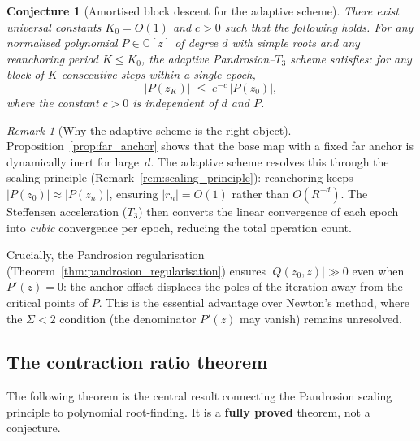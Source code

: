 \documentclass[10pt,a4paper,oneside]{book}
\newtheorem{conjecture}[theorem]{Conjecture}
\theoremstyle{definition}
\theoremstyle{remark}
\newtheorem{remark}[theorem]{Remark}
\newcommand{\CC}{\mathbb{C}}
\begin{document}
\begin{conjecture}[Amortised block descent for the adaptive scheme]
\label{conj:block_descent}
There exist universal constants $K_0 = O(1)$ and $c > 0$ such that the following holds.  For any normalised polynomial $P \in \CC[z]$ of degree $d$ with simple roots and any reanchoring period $K \leq K_0$, the adaptive Pandrosion--$T_3$ scheme satisfies: for any block of $K$ consecutive steps within a single epoch,
\begin{equation}
  \label{eq:block_descent}
  |P(z_{K})| \;\leq\; e^{-c}\, |P(z_0)|,
\end{equation}
where the constant $c > 0$ is independent of $d$ and $P$.
\end{conjecture}

\begin{remark}[Why the adaptive scheme is the right object]
\label{rem:why_adaptive}
Proposition~\ref{prop:far_anchor} shows that the base map with a fixed far anchor is dynamically inert for large~$d$.  The adaptive scheme resolves this through the scaling principle (Remark~\ref{rem:scaling_principle}): reanchoring keeps $|P(z_0)| \approx |P(z_n)|$, ensuring $|r_n| = O(1)$ rather than $O(R^{-d})$.  The Steffensen acceleration ($T_3$) then converts the linear convergence of each epoch into \emph{cubic} convergence per epoch, reducing the total operation count.

Crucially, the Pandrosion regularisation (Theorem~\ref{thm:pandrosion_regularisation}) ensures $|Q(z_0,z)| \gg 0$ even when $P'(z) = 0$: the anchor offset displaces the poles of the iteration away from the critical points of $P$.  This is the essential advantage over Newton's method, where the $\bar{\Sigma} < 2$ condition (the denominator $P'(z)$ may vanish) remains unresolved.
\end{remark}

\subsection{The contraction ratio theorem}
\label{sec:contraction_ratio}

The following theorem is the central result connecting the Pandrosion scaling principle to polynomial root-finding.  It is a \textbf{fully proved} theorem, not a conjecture.
\end{document}
